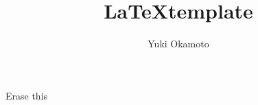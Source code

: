 \documentclass{jsarticle}
\title{\LaTeX template}
\author{Yuki Okamoto}
\begin{document}
\maketitle

Erase this \cite{template}



\end{document}

